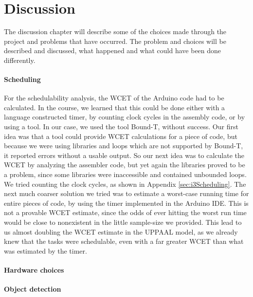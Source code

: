 \chapter{Discussion}
\label{chap:Discussion}
The discussion chapter will describe some of the choices made through the project and problems that have occurred. The problem and choices will be described and discussed, what happened and what could have been done differently. 

\subsubsection{Scheduling}
For the schedulability analysis, the WCET of the Arduino code had to be calculated. In the course, we learned that this could be done either with a language constructed timer, by counting clock cycles in the assembly code, or by using a tool. In our case, we used the tool Bound-T, without success. Our first idea was that a tool could provide WCET calculations for a piece of code, but because we were using libraries and loops which are not supported by Bound-T, it reported errors without a usable output. So our next idea was to calculate the WCET by analyzing the assembler code, but yet again the libraries proved to be a problem, since some libraries were inaccessible and contained unbounded loops. We tried counting the clock cycles, as shown in Appendix \ref{sec:i3Scheduling}. The next much coarser solution we tried was to estimate a worst-case running time for entire pieces of code, by using the timer implemented in the Arduino IDE. This is not a provable WCET estimate, since the odds of ever hitting the worst run time would be close to nonexistent in the little sample-size we provided. This lead to us almost doubling the WCET estimate in the UPPAAL model, as we already knew that the tasks were schedulable, even with a far greater WCET than what was estimated by the timer.

\subsubsection{Hardware choices}


\subsubsection{Object detection}

